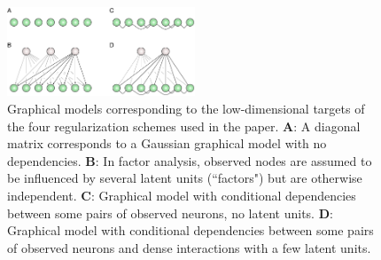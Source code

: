 \begin{figure}[htp]
\centering
\includegraphics[width=0.5\textwidth]{figures/Figure2.pdf}
\caption{
Graphical models corresponding to the low-dimensional targets of the four regularization schemes used in the paper.
\textbf{A}: A diagonal matrix corresponds to a Gaussian graphical model with no dependencies.
\textbf{B}: In factor analysis, observed nodes are assumed to be influenced by several latent units (``factors") but are otherwise independent.
\textbf{C}: Graphical model with conditional dependencies between some pairs of observed neurons, no latent units. 
\textbf{D}: Graphical model with conditional dependencies between some pairs of observed neurons and dense interactions with a few latent units.
}\label{fig:02}
\end{figure}

